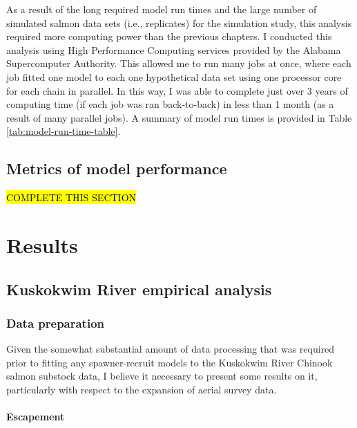 \documentclass[12pt,]{book}
\let\oldparagraph\paragraph
\renewcommand{\paragraph}[1]{\oldparagraph{#1}\mbox{}}
\theoremstyle{definition}
\theoremstyle{definition}
\theoremstyle{definition}
\theoremstyle{remark}
\begin{document}
As a result of the long required model run times and the large number of
simulated salmon data sets (i.e., replicates) for the simulation study,
this analysis required more computing power than the previous chapters.
I conducted this analysis using High Performance Computing services
provided by the Alabama Supercomputer Authority. This allowed me to run
many jobs at once, where each job fitted one model to each one
hypothetical data set using one processor core for each chain in
parallel. In this way, I was able to complete just over 3 years of
computing time (if each job was ran back-to-back) in less than 1 month
(as a result of many parallel jobs). A summary of model run times is
provided in Table \ref{tab:model-run-time-table}.

\subsection{Metrics of model
performance}\label{metrics-of-model-performance}

\noindent
\hl{COMPLETE THIS SECTION}

\section{Results}\label{results}

\subsection{Kuskokwim River empirical
analysis}\label{kuskokwim-river-empirical-analysis}

\subsubsection{Data preparation}\label{data-prep-results}

\noindent
Given the somewhat substantial amount of data processing that was
required prior to fitting any spawner-recruit models to the Kuskokwim
River Chinook salmon substock data, I believe it necessary to present
some results on it, particularly with respect to the expansion of aerial
survey data.

\paragraph{Escapement}\label{esc-data-results}
\end{document}
